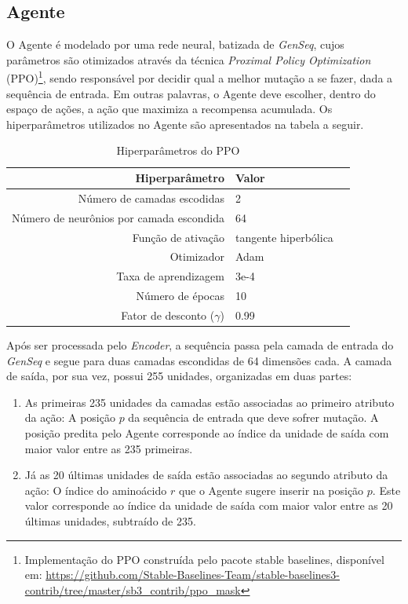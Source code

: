 \subsection{Agente}
\label{subsection:Agente}
O Agente é modelado por uma rede neural, batizada de \textit{GenSeq}, 
cujos parâmetros são otimizados através da técnica 
\textit{Proximal Policy Optimization} (PPO)\footnote{Implementação do PPO construída pelo pacote stable baselines, disponível em: \url{https://github.com/Stable-Baselines-Team/stable-baselines3-contrib/tree/master/sb3_contrib/ppo_mask}}, 
sendo responsável por decidir qual a melhor mutação a se fazer, dada a sequência de entrada. Em outras palavras, o Agente deve escolher,
dentro do espaço de ações, a ação que maximiza a recompensa acumulada.
Os hiperparâmetros utilizados no Agente são apresentados na tabela a seguir. 

\begin{table}[H]
\centering
\vspace{0.5cm}
\begin{tabular}{r|lr}
Hiperparâmetro & Valor \\ 
\hline                               
Número de camadas escodidas & 2 \\
Número de neurônios por camada escondida & 64 \\
Função de ativação & tangente hiperbólica \\
Otimizador & Adam \\
Taxa de aprendizagem & 3e-4 \\
Número de épocas & 10 \\
Fator de desconto ($\gamma$) & 0.99 \\
\end{tabular}
\caption{Hiperparâmetros do PPO}
\end{table}

Após ser processada pelo \textit{Encoder}, a sequência passa pela camada de entrada do \textit{GenSeq} e 
segue para duas camadas escondidas de 64 dimensões cada. 
A camada de saída, por sua vez, possui 255 unidades, organizadas em duas partes:

\begin{enumerate}
  \item As primeiras 235 unidades da camadas estão associadas ao primeiro atributo da ação: A posição $p$ da sequência de entrada
  que deve sofrer mutação. A posição predita pelo Agente corresponde ao índice da unidade de saída com maior valor entre as 235 primeiras. 
  \item Já as 20 últimas unidades de saída estão associadas ao segundo atributo da ação: O índice do aminoácido $r$ que o Agente sugere inserir na posição $p$.
  Este valor corresponde ao índice da unidade de saída com maior valor entre as 20 últimas unidades, subtraído de 235.
\end{enumerate}

